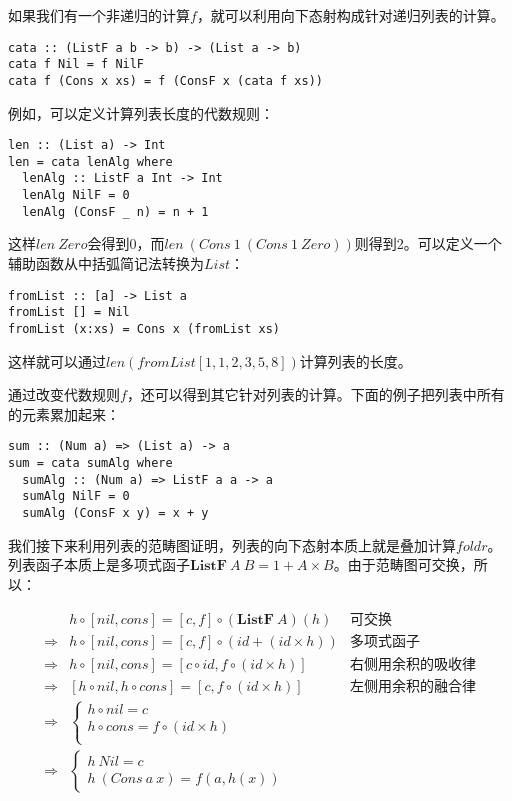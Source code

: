 \documentclass{article}
\begin{document}
\begin{example}
如果我们有一个非递归的计算$f$，就可以利用向下态射构成针对递归列表的计算。

\lstset{frame=single}
\begin{lstlisting}[style=Haskell]
cata :: (ListF a b -> b) -> (List a -> b)
cata f Nil = f NilF
cata f (Cons x xs) = f (ConsF x (cata f xs))
\end{lstlisting}

例如，可以定义计算列表长度的代数规则：

\begin{lstlisting}[style=Haskell]
len :: (List a) -> Int
len = cata lenAlg where
  lenAlg :: ListF a Int -> Int
  lenAlg NilF = 0
  lenAlg (ConsF _ n) = n + 1
\end{lstlisting}

这样$len\ Zero$会得到0，而$len\ (Cons\ 1\ (Cons\ 1\ Zero))$则得到2。可以定义一个辅助函数从中括弧简记法转换为$List$：

\begin{lstlisting}
fromList :: [a] -> List a
fromList [] = Nil
fromList (x:xs) = Cons x (fromList xs)
\end{lstlisting}

这样就可以通过$len (fromList [1, 1, 2, 3, 5, 8])$计算列表的长度。

通过改变代数规则$f$，还可以得到其它针对列表的计算。下面的例子把列表中所有的元素累加起来：

\begin{lstlisting}
sum :: (Num a) => (List a) -> a
sum = cata sumAlg where
  sumAlg :: (Num a) => ListF a a -> a
  sumAlg NilF = 0
  sumAlg (ConsF x y) = x + y
\end{lstlisting}

我们接下来利用列表的范畴图证明，列表的向下态射本质上就是叠加计算$foldr$。
列表函子本质上是多项式函子$\mathbf{ListF}\ A\ B = 1 + A \times B$。由于范畴图可交换，所以：

\[
\begin{array}{rll}
            & h \circ [nil, cons] = [c, f] \circ (\mathbf{ListF}\ A)(h) & \text{可交换} \\
\Rightarrow & h \circ [nil, cons] = [c, f] \circ (id + (id \times h)) & \text{多项式函子} \\
\Rightarrow & h \circ [nil, cons] = [c \circ id, f \circ (id \times h)] & \text{右侧用余积的吸收律} \\
\Rightarrow & [h \circ nil, h \circ cons] = [c, f \circ (id \times h)] & \text{左侧用余积的融合律} \\
\Rightarrow &
  \begin{cases}
    h \circ nil = c \\
    h \circ cons = f \circ (id \times h) \\
  \end{cases} & \\
\Rightarrow &
  \begin{cases}
    h\ Nil = c \\
    h\ (Cons\ a\ x) = f(a, h(x))
  \end{cases} & \\
\end{array}
\]


\end{example}
\end{document}
